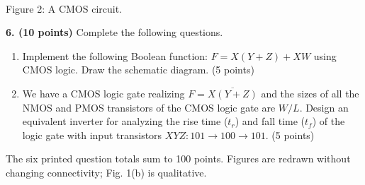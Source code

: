 \documentclass[10pt]{article}
\newcommand{\mos}[4]{\begin{scope}[shift={(#1,#2)}]
\draw (0,.24)--(0,-.24);\draw (0,.20)--(.25,.20)--(.25,.5);
\draw (0,-.20)--(.25,-.20)--(.25,-.5);\draw (-.16,.23)--(-.16,-.23);
\ifnum#4=1\draw (-.26,0) circle (.06);\draw (-.75,0)--(-.32,0);\else\draw (-.75,0)--(-.16,0);\fi
\node[anchor=east,font=\scriptsize] at (-.76,0) {$#3$};\end{scope}}
\begin{document}
\begin{center}\\Figure 2: A CMOS circuit.\end{center}
\textbf{6. (10 points)} Complete the following questions.
\begin{enumerate}[label=(\alph*),leftmargin=7mm]
\item Implement the following Boolean function: $F=X(Y+Z)+XW$ using CMOS logic. Draw the schematic diagram. (5 points)
\item We have a CMOS logic gate realizing $F=\overline{X(Y+Z)}$ and the sizes of all the NMOS and PMOS transistors of the CMOS logic gate are $W/L$. Design an equivalent inverter for analyzing the rise time ($t_r$) and fall time ($t_f$) of the logic gate with input transistors $XYZ:101\to100\to101$. (5 points)
\end{enumerate}
\vfill\small The six printed question totals sum to 100 points. Figures are redrawn without changing connectivity; Fig. 1(b) is qualitative.
\end{document}
